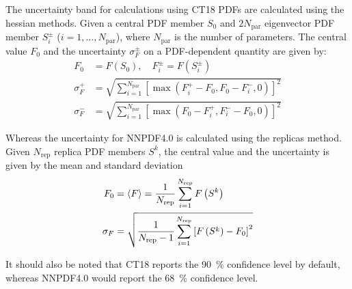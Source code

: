 \documentclass[../main.tex]{subfiles}
\begin{document}
The uncertainty band for calculations using CT18 PDFs are calculated using the hessian methods.
Given a central PDF member $S_0$ and $2N_{\mathrm{par}}$ eigenvector PDF member $S^\pm_i$ ($i=1,\dots,N_{\mathrm{par}}$),
where $N_{\mathrm{par}}$ is the number of parameters. The central value $F_0$ and the uncertainty $\sigma^\pm_F$
on a PDF-dependent quantity are given by:
\begin{equation}
	\begin{split}
		F_0 &= F(S_0),\quad F_i^\pm=F(S_i^\pm) \\
		\sigma^+_F &= \sqrt{\sum_{i=1}^{N_{\mathrm{par}}} \left[\max\left(F_i^+ - F_0, F_0 - F^-_i,0\right)\right]^2 }\\
		\sigma^-_F &= \sqrt{\sum_{i=1}^{N_{\mathrm{par}}} \left[\max\left(F_0 - F^+_i, F_i^- - F_0,0\right)\right]^2 }
	\end{split}
\end{equation}

Whereas the uncertainty for NNPDF4.0 is calculated using the replicas method. Given $N_{\mathrm{rep}}$ replica
PDF members $S^k$, the central value and the uncertainty is given by the mean and standard deviation
\begin{equation}
	\begin{split}
		F_0&=\expval{F}=\frac{1}{N_{\mathrm{rep}}}\sum_{i=1}^{N_{\mathrm{rep}}}F\left(S^k\right)\\
		\sigma_F&= \sqrt{\frac{1}{N_{\mathrm{rep}}-1}\sum_{i=1}^{N_{\mathrm{rep}}}\left[F\left(S^k\right)-F_0\right]^2}
	\end{split}
\end{equation}

It should also be noted that CT18 reports the \SI{90}{\percent} confidence level by default, whereas NNPDF4.0
would report the \SI{68}{\percent} confidence level.
\end{document}
